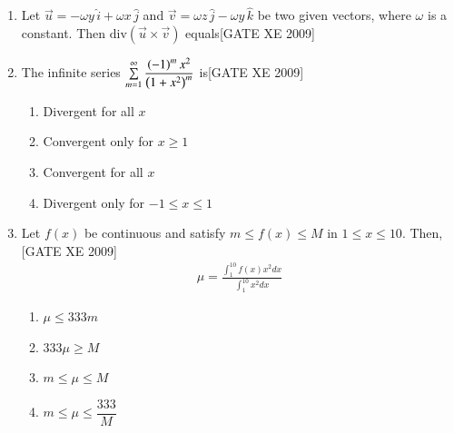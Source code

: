 \documentclass[journal,12pt,onecolumn]{IEEEtran}
\theoremstyle{remark}
\begin{document}
\begin{enumerate}
\item Let $\vec{u} = -\omega y\, \hat{i} + \omega x\, \hat{j}$ and $\vec{v} = \omega z\, \hat{j} - \omega y\, \hat{k}$ be two given vectors, where $\omega$ is a constant. Then $\mathrm{div} (\vec{u} \times \vec{v})$ equals\hfill[GATE XE 2009]\\
 \begin{enumerate}
\end{enumerate}
\item The infinite series $\sum\limits_{m=1}^\infty \dfrac{\left(-1\right)^m x^2}{\left(1 + x^2\right)^m}$ is\hfill[GATE XE 2009]
    \begin{enumerate}
        \item Divergent for all $x$
        \item Convergent only for $x \geq 1$
        \item Convergent for all $x$
        \item Divergent only for $-1 \leq x \leq 1$
    \end{enumerate}

\item Let $f(x)$ be continuous and satisfy $m \leq f(x) \leq M$ in $1 \leq x \leq 10$. Then,\hfill[GATE XE 2009]
\begin{align*}
    \mu = \frac{\int_1^{10} f(x) x^2 dx}{\int_1^{10} x^2 dx}
\end{align*}
\begin{multicols}{4}
\begin{enumerate}
 
 
      \item   $\mu \leq 333 m$
       \item  $333 \mu \geq M$
       \item $m \leq \mu \leq M$
       \item  $m \leq \mu \leq \dfrac{333}{M}$
        
     \end{enumerate}
  \end{multicols}

   




\end{enumerate}
\end{document}
